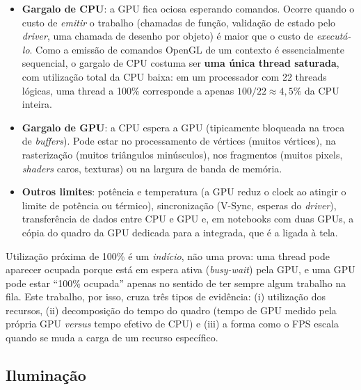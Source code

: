 \documentclass[12pt,a4paper]{article}
\begin{document}
\begin{itemize}
  \item \textbf{Gargalo de CPU}: a GPU fica ociosa esperando comandos. Ocorre quando o custo de
        \emph{emitir} o trabalho (chamadas de função, validação de estado pelo \emph{driver},
        uma chamada de desenho por objeto) é maior que o custo de \emph{executá-lo}. Como a
        emissão de comandos OpenGL de um contexto é essencialmente sequencial, o gargalo de CPU
        costuma ser \textbf{uma única thread saturada}, com utilização total da CPU baixa: em
        um processador com 22 threads lógicas, uma thread a 100\% corresponde a apenas
        $100/22 \approx 4{,}5\%$ da CPU inteira.
  \item \textbf{Gargalo de GPU}: a CPU espera a GPU (tipicamente bloqueada na troca de
        \emph{buffers}). Pode estar no processamento de vértices (muitos vértices), na
        rasterização (muitos triângulos minúsculos), nos fragmentos (muitos pixels, \emph{shaders}
        caros, texturas) ou na largura de banda de memória.
  \item \textbf{Outros limites}: potência e temperatura (a GPU reduz o clock ao atingir o limite
        de potência ou térmico), sincronização (V-Sync, esperas do \emph{driver}), transferência
        de dados entre CPU e GPU e, em notebooks com duas GPUs, a cópia do quadro da GPU dedicada
        para a integrada, que é a ligada à tela.
\end{itemize}
Utilização próxima de 100\% é um \emph{indício}, não uma prova: uma thread pode aparecer ocupada
porque está em espera ativa (\emph{busy-wait}) pela GPU, e uma GPU pode estar ``100\% ocupada''
apenas no sentido de ter sempre algum trabalho na fila. Este trabalho, por isso, cruza três tipos
de evidência: (i) utilização dos recursos, (ii) decomposição do tempo do quadro (tempo de GPU
medido pela própria GPU \emph{versus} tempo efetivo de CPU) e (iii) a forma como o FPS escala
quando se muda a carga de um recurso específico.

\subsection{Iluminação}
\end{document}
